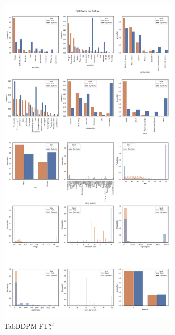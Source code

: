 \begin{landscape}
\begin{figure}[h]
\begin{subfigure}{0.3\linewidth}
		\end{subfigure}
		\hfill
		\begin{subfigure}{0.3\linewidth}
			\includegraphics[height=\textheight,width=\linewidth,keepaspectratio]{images/distributions_full/tab-ddpm-ft.jpg}
			\caption{TabDDPM-FT$^{ml}_q$}
		\end{subfigure}
		\hfill
		\begin{subfigure}{0.3\linewidth}

\end{subfigure}
\end{figure}
\end{landscape}
